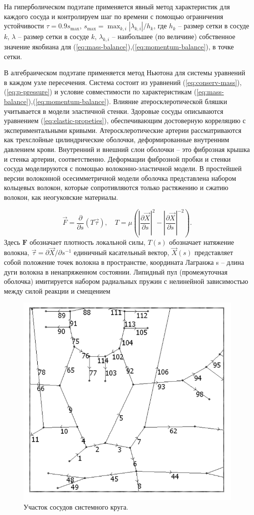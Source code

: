 На гиперболическом подэтапе применяется явный метод характеристик для каждого сосуда и контролируем шаг по времени с помощью 
ограничения устойчивости $\tau = 0.9 s_{\max}$, $s_{\max}=\max_{k,i}|\lambda _{k,i}|/h_k$, где $h_k$ -- размер сетки в сосуде $k$, 
$\lambda$ -- размер сетки в сосуде $k$,  $\lambda _{k,i}$ -- наибольшее (по величине) собственное значение якобиана для  (\ref{eq:mass-balance}),(\ref{eq:momentum-balance}), 
 в точке сетки.

В алгебраическом подэтапе применяется метод Ньютона для системы уравнений в каждом узле пересечения. 
Система состоит из уравнений (\ref{eq:conserv-mass}),(\ref{eq:p-pressure}) и условие совместимости по характеристикам (\ref{eq:mass-balance}),(\ref{eq:momentum-balance}). 
Влияние атеросклеротической бляшки учитывается в модели эластичной стенки. Здоровые сосуды описываются уравнением (\ref{eq:elastic-propeties}), 
обеспечивающим достоверную корреляцию с экспериментальными кривыми. Атеросклеротические артерии рассматриваются как 
трехслойные цилиндрические оболочки, деформированные внутренним давлением крови. Внутренний и внешний слои оболочки -- это 
фиброзная крышка и стенка артерии, соответственно. Деформации фиброзной пробки и стенки сосуда моделируются с помощью 
волоконно-эластичной модели. В простейшей версии волоконной осесимметричной модели оболочка представлена набором кольцевых волокон, 
которые сопротивляются только растяжению и сжатию волокон, как неогуковские материалы.

\begin{equation}
    \label{loc-force}
    \vec{F}=\frac{\partial}{\partial s}(T\vec{\tau}),
    \quad
    T=\mu\left(\left|\frac{\partial \vec{X}}{\partial s}\right|^2-\left|\frac{\partial \Vec{X}}{\partial s}\right|^{-2}\right).
\end{equation}
Здесь $\mathbf{F}$ обозначает плотность локальной силы, $T(s)$ обозначает натяжение волокна, 
$\Vec{\tau} =\partial \Vec{X}/\partial s^{-1}$ единичный касательный вектор, $\Vec{X}(s)$ 
представляет собой положение точек волокна в пространстве, координата Лагранжа s -- длина дуги волокна в ненапряженном состоянии. 
Липидный пул (промежуточная оболочка) имитируется набором радиальных пружин с нелинейной зависимостью между силой реакции и смещением

\begin{figure}[h]
\centering
\includegraphics[width=0.4\linewidth]{chast.png}
\caption{Участок сосудов системного круга.}
\label{ych}
\end{figure}

